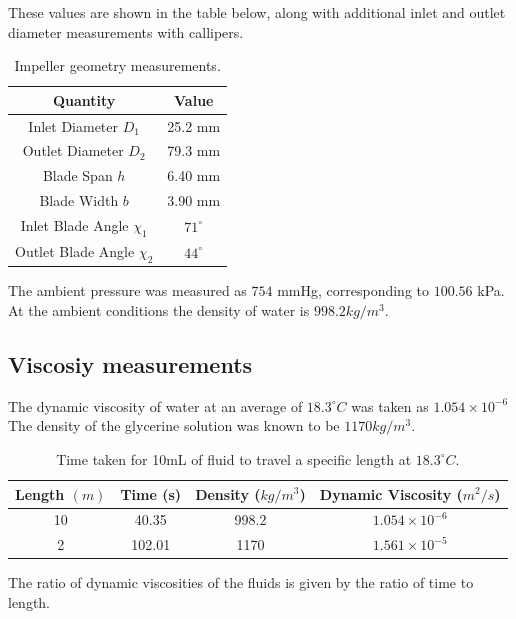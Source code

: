 \documentclass{article}
\begin{document}
These values are shown in the table below, along with additional inlet and outlet diameter measurements with callipers.

\begin{table}[H]
    \centering
    \begin{tabular}{|c|c|}
        \hline
        \textbf{Quantity} & \textbf{Value} \\
        \hline
        Inlet Diameter $D_1$ & 25.2 mm \\
        Outlet Diameter $D_2$ & 79.3 mm \\
        Blade Span $h$ & 6.40 mm \\
        Blade Width $b$ & 3.90 mm \\
        Inlet Blade Angle $\chi_1$ & $71^\circ$ \\
        Outlet Blade Angle $\chi_2$ & $44^\circ$ \\
        \hline
    \end{tabular}
    \caption{Impeller geometry measurements.}
    \label{tab:impeller_geometry}
\end{table}

The ambient pressure was measured as $754$ mmHg, corresponding to $100.56$ kPa.
At the ambient conditions the density of water is $998.2 kg/m^3$.

\subsection{Viscosiy measurements}

The dynamic viscosity of water at an average of $18.3^\circ C$ was taken as $1.054 \times 10^{-6}$
The density of the glycerine solution was known to be $1170 kg/m^3$.

\begin{table}[H]
    \centering
    \begin{tabular}{|c|c|c|c|}
        \hline
        \textbf{Length} $(m)$ & \textbf{Time} (s) & \textbf{Density} ($kg/m^3$) & \textbf{Dynamic Viscosity} ($m^2/s$) \\
        \hline
        10 & 40.35 & 998.2 & $1.054 \times 10^{-6}$\\
        2 & 102.01 & 1170 & $1.561 \times 10^{-5}$\\
        \hline
    \end{tabular}
    \caption{Time taken for 10mL of fluid to travel a specific length at $18.3^\circ C.$}
    \label{tab:viscosity}
\end{table}

The ratio of dynamic viscosities of the fluids is given by the ratio of time to length.
\end{document}
